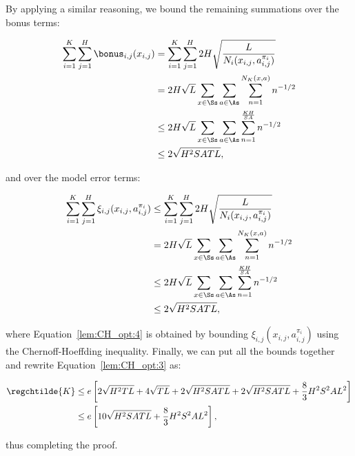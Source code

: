 By applying a similar reasoning, we bound the remaining summations over the bonus terms:

\begin{align}
    \sum_{i=1}^K \sum_{j=1}^H \bonus_{i,j}(x_{i,j}) &= \sum_{i=1}^K \sum_{j=1}^H 2H \sqrt{\frac{L}{N_i (x_{i,j}, a_{i,j}^{\pi_i})}} \nonumber \\
    &= 2H \sqrt{L} \sum_{x\in\Ss}\sum_{a\in\As} \sum_{n=1}^{N_K(x,a)} n^{-1/2} \nonumber \\
    &\le 2H \sqrt{L} \sum_{x\in\Ss}\sum_{a\in\As} \sum_{n=1}^{\frac{KH}{SA}} n^{-1/2} \nonumber \\
    &\le 2 \sqrt{H^2 S A T L}, \nonumber
\end{align}

and over the model error terms:

\begin{align}
    \sum_{i=1}^K \sum_{j=1}^H \xi_{i,j} (x_{i,j}, a_{i,j}^{\pi_i}) &\le \sum_{i=1}^K \sum_{j=1}^H 2 H \sqrt{\frac{L}{N_i (x_{i,j}, a_{i,j}^{\pi_i})}} \label{lem:CH_opt:4} \\
    &= 2 H \sqrt{L} \sum_{x\in\Ss}\sum_{a\in\As} \sum_{n=1}^{N_K(x,a)} n^{-1/2} \nonumber \\
    &\le 2H \sqrt{L} \sum_{x\in\Ss}\sum_{a\in\As} \sum_{n=1}^{\frac{KH}{SA}} n^{-1/2} \nonumber \\
    &\le 2 \sqrt{H^2 S A T L}, \nonumber
\end{align}

where Equation~\eqref{lem:CH_opt:4} is obtained by bounding $\xi_{i,j} (x_{i,j}, a_{i,j}^{\pi_i})$ using the Chernoff-Hoeffding inequality.
Finally, we can put all the bounds together and rewrite Equation~\eqref{lem:CH_opt:3} as:

\begin{align*}
    \regchtilde{K} &\le e \left[ 2 \sqrt{H^2 T L} + 4 \sqrt{TL} + 2 \sqrt{H^2 S A T L} + 2 \sqrt{H^2 S A T L} + \frac{8}{3} H^2 S^2 A L^2 \right] \\
    &\le e \left[ 10 \sqrt{H^2 S A T L} + \frac{8}{3} H^2 S^2 A L^2 \right],
\end{align*}

thus completing the proof.